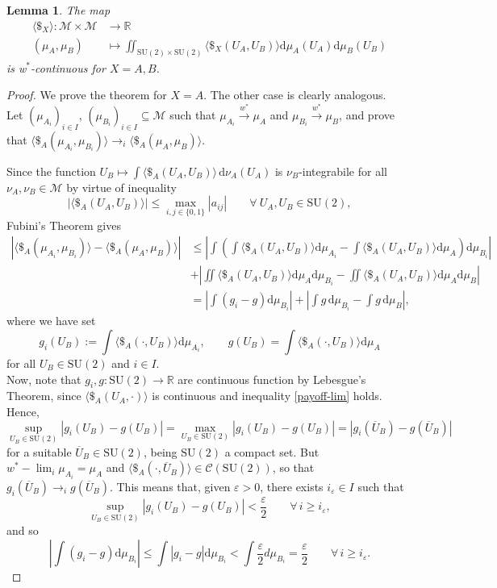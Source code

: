 \documentclass[11pt,a4paper,twoside]{article}
\newcommand{\de}{\mathrm{d}} %
\newtheorem{lemma}[definition]{Lemma}
\begin{document}
\begin{lemma}\label{contw}
The map
\begin{align*}
    \langle\$_X\rangle : \mathcal{M} \times \mathcal{M} &\to \mathbb{R}\\
    (\mu_A,\mu_B)&\mapsto\iint_{\mathrm{SU(2)}\times \mathrm{SU(2)}} \langle\$_X(U_A, U_B)\rangle \de\mu_A(U_A)\de\mu_B(U_B)
\end{align*}
is w$^*$-continuous for $X=A,B$.
\end{lemma}
\begin{proof} We prove the theorem for $X=A$. The other case is clearly analogous.\\
Let $(\mu_{A_i})_{i \in I}$, $(\mu_{B_i})_{i\in I}\subseteq\mathcal{M}$ such that
$\mu_{A_i} \xrightarrow{w^*} \mu_A$ and $\mu_{B_i} \xrightarrow{w^*} \mu_B$, and prove that $\langle\$_A(\mu_{A_i}, \mu_{B_i})\rangle \rightarrow_i \langle\$_A(\mu_A, \mu_B)\rangle$.

Since the function $U_B \mapsto \int \langle\$_A(U_A, U_B)\rangle \, \de\nu_A(U_A)$ is $\nu_B$-integrabile for all $\nu_A,\nu_B\in\mathcal{M}$ by virtue of inequality
\begin{equation}\label{payoff-lim}
|\langle\$_A(U_A, U_B)\rangle| \leq\max_{i,j\in\{0,1\}} |a_{ij}| \qquad \forall\  U_A, U_B \in \mathrm{SU(2)},
\end{equation}
Fubini's Theorem gives
\begin{align*}
| \langle\$_A(\mu_{A_i}, \mu_{B_i})\rangle - \langle \$_A(\mu_A, \mu_B)\rangle | &\leq
  \left| \int \left( \int \langle\$_A(U_A, U_B)\rangle  \de\mu_{A_i} - \int \langle\$_A(U_A, U_B)\rangle  \de\mu_A \right) \de\mu_{B_i} \right| \\
 &+ \left| \iint \langle\$_A(U_A, U_B)\rangle \de\mu_A \de\mu_{B_i} - \iint \langle\$_A(U_A, U_B)\rangle  \de\mu_A \de\mu_B  \right|\\
 &=\left| \int (g_i-g) \de\mu_{B_i}\right|+\left| \int g\, \de\mu_{B_i} - \int g\, \de\mu_B \right|,
\end{align*}
where we have set
\[ g_i(U_B) := \int \langle\$_A(\cdot, U_B)\rangle \de\mu_{A_i},\qquad g(U_B)=\int \langle\$_A(\cdot, U_B)\rangle \de\mu_A \] 
for all $U_B\in \mathrm{SU(2)}$ and $i\in I$.\\
Now, note that \( g_i,g : \mathrm{SU(2)} \to \mathbb{R} \) are continuous function by Lebesgue's Theorem, since \( \langle\$_A(U_A, \cdot) \rangle\) is continuous and inequality \eqref{payoff-lim} holds. Hence, 
\[\sup_{U_B\in \mathrm{SU(2)}} |g_i(U_B)-g(U_B)| = \max_{U_B \in \mathrm{SU(2)}} |g_i(U_B)-g(U_B)| = |g_i(\overline{U}_B)-g(\overline{U}_B)|\]
for a suitable \( \overline{U}_B \in \mathrm{SU(2)} \), being \( \mathrm{SU(2)} \) a compact set. But $w^*-\lim_i\mu_{A_i}=\mu_A$ and $\langle\$_A(\cdot, \overline{U}_B)\rangle\in\mathcal{C}(\mathrm{SU(2)})$, so that $g_i(\overline{U}_B)\rightarrow_ig(\overline{U}_B)$. This means that, given $\varepsilon>0$, there exists $i_\varepsilon\in I$ such that 
$$\sup_{U_B\in \mathrm{SU(2)}} |g_i(U_B)-g(U_B)| < \frac{\varepsilon}{2}\qquad\forall\,  i \ge i_\varepsilon,$$
and so
$$\left| \int (g_i-g) \de\mu_{B_i}\right|\leq \int |g_i-g|\de\mu_{B_i}< \int \frac{\varepsilon}{2} d\mu_{B_i} = \frac{\varepsilon}{2}\qquad\forall\,  i \ge i_\varepsilon.$$


\end{proof}
\end{document}
